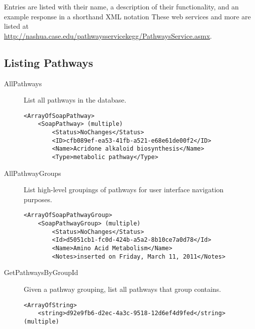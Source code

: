 Entries are listed with their name, a description of their functionality, and
an example response in a shorthand XML notation These web services and more
are listed at \\
\href{http://nashua.case.edu/pathwaysservicekegg/PathwaysService.asmx}{http://nashua.case.edu/pathwaysservicekegg/PathwaysService.asmx}.

\subsection{Listing Pathways}
\begin{description}
    \item[AllPathways] List all pathways in the \pathcasekegg database.

    \begin{lstlisting}
<ArrayOfSoapPathway>
    <SoapPathway> (multiple)
        <Status>NoChanges</Status>
        <ID>cfb089ef-ea53-41fb-a521-e68e61de00f2</ID>
        <Name>Acridone alkaloid biosynthesis</Name>
        <Type>metabolic pathway</Type>
    \end{lstlisting}

    \item[AllPathwayGroups] List high-level groupings of pathways for user
    interface navigation purposes.

    \begin{lstlisting}
<ArrayOfSoapPathwayGroup>
    <SoapPathwayGroup> (multiple)
        <Status>NoChanges</Status>
        <Id>d5051cb1-fc0d-424b-a5a2-8b10ce7a0d78</Id>
        <Name>Amino Acid Metabolism</Name>
        <Notes>inserted on Friday, March 11, 2011</Notes>
    \end{lstlisting}

    \item[GetPathwaysByGroupId] Given a pathway grouping, list all pathways
    that group contains.

    \begin{lstlisting}
<ArrayOfString>
    <string>d92e9fb6-d2ec-4a3c-9518-12d6ef4d9fed</string> (multiple)
    \end{lstlisting}

\end{description}

